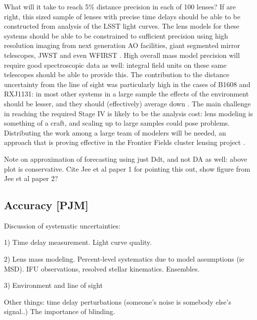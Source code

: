 What will it take to reach 5\% distance precision in each of 100 lenses?
If \citet{LiaoEtal2015} are right, this sized sample of lenses with
precise time delays should be able to be constructed from analysis of
the LSST light curves. The lens models for these systems should be able
to be constrained to sufficient precision using high resolution imaging
from next generation AO facilities, giant segmented mirror telescopes,
JWST and even WFIRST \citep{Men++15}. High overall mass model precision
will require good spectroscopic data as well: integral field units on
these same telescopes should be able to provide this. The contribution
to the distance uncertainty from the line of sight was particularly high
in the  cases of B1608 and RXJ1131: in most other systems in a large
sample the effects of the environment should be lesser, and they should
(effectively) average down \citep{Col++13}. The main challenge in
reaching the required Stage IV is likely to be the analysis cost: lens
modeling is something of a craft, and scaling up to large samples could
pose problems. Distributing the work among a large team of modelers will
be needed, an approach that is proving effective in the Frontier Fields
cluster lensing project \citep{FF}.

Note on approximation of forecasting using just Ddt,
and not DA as well: above plot is conservative.
Cite Jee et al paper 1 for pointing this out,
show figure from Jee et al paper 2?



\subsection{Accuracy [PJM]}

Discussion of systematic uncertainties:

1) Time delay measurement. Light curve quality.

2) Lens mass modeling. Percent-level systematics due to model
assumptions (ie MSD). IFU observations, resolved stellar kinematics.
Ensembles.

3) Environment and line of sight

Other things: time delay perturbations (someone's noise is somebody else's signal..)
The importance of blinding.
